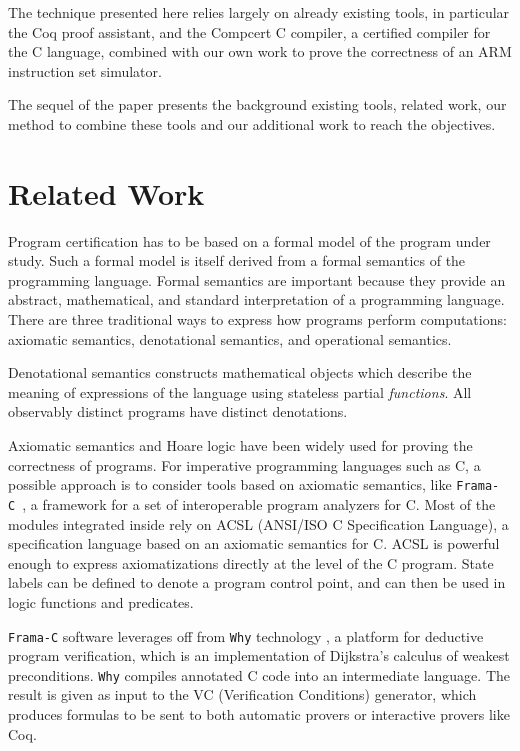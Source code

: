 \documentclass[a4paper, conference]{IEEEtran}
\newcommand{\why}{\texttt{Why}\xspace}
\newcommand{\framac}{\texttt{Frama-C}\xspace}
\begin{document}
The technique presented here relies largely on already existing tools,
in particular the Coq proof assistant, and the Compcert C compiler, a
certified compiler for the C language, combined with our own work to prove
the correctness of an ARM instruction set simulator.

The sequel of the paper presents the background existing tools,
related work, our method to combine these tools and our additional work
to reach the objectives.


\section{Related Work}
\label{related}

Program certification has to be based on a formal model of the program
under study.  Such a formal model is itself derived from a formal
semantics of the programming language.  Formal semantics are important
because they provide an abstract, mathematical, and standard
interpretation of a programming language.  There are three traditional
ways to express how programs perform computations: axiomatic
semantics, denotational semantics, and operational semantics.

Denotational semantics \cite{stoy-denotational} constructs
mathematical objects which describe the meaning of expressions of the
language using stateless partial \emph{functions}.  All observably
distinct programs have distinct denotations.  \

Axiomatic semantics and Hoare logic\cite{Floyd67, Hoare-1969} have
been widely used for proving the correctness of programs.  For
imperative programming languages such as C, a possible approach is to
consider tools based on axiomatic semantics, like
\framac~\cite{canet2009value}, a framework for a set of interoperable
program analyzers for C. Most of the modules integrated inside rely on
ACSL (ANSI/ISO C Specification Language), a specification language
based on an axiomatic semantics for C.  ACSL is powerful enough to
express axiomatizations directly at the level of the C program.  State
labels can be defined to denote a program control point, and can then
be used in logic functions and predicates.

\framac software leverages off from \why technology
\cite{bobot2011why3, filliatre07cav}, a platform for deductive program
verification, which is an implementation of Dijkstra's calculus of
weakest preconditions.  \why compiles annotated C code into an
intermediate language.  The result is given as input to the VC
(Verification Conditions) generator, which produces formulas to be
sent to both automatic provers or interactive provers like Coq.
\end{document}
